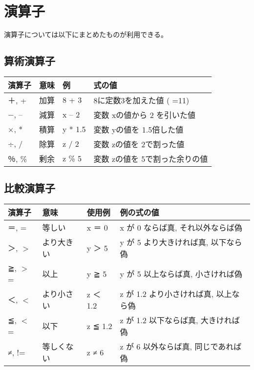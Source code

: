 \documentclass[11pt,a4j]{jarticle}
\begin{document}

\section{演算子}
\vspace{-0.2cm}
演算子については以下にまとめたものが利用できる。
\subsection{算術演算子}
\begin{table}[htbp]
  \begin{center}
    \begin{tabular}{p{1.5cm}|p{2.0cm}|p{1.7cm}|p{6.3cm}} \hline
    演算子	& 意味	& 例		& 式の値	\\ \hline
    ＋, +	& 加算	& 8 + 3		& 8に定数3を加えた値 ( =11)			\\ \hline
    −, --	& 減算	& x -- 2	& 変数 xの値から 2 を引いた値	 	\\ \hline
    ×, *	& 積算	& y * 1.5	& 変数 yの値を 1.5倍した値			\\ \hline
    ÷, /	& 除算	& z / 2		& 変数 zの値を 2で割った値			\\ \hline
    ％, \%	& 剰余	& z \% 5	& 変数 zの値を 5で割った余りの値	\\ \hline
    \end{tabular}
  \end{center}
  \vspace{-1.0cm}
\end{table}


\subsection{比較演算子}
\begin{table}[htbp]
  \begin{center}
    \begin{tabular}{p{1.5cm}|p{2.0cm}|p{1.7cm}|p{6.3cm}} \hline
    演算子		& 意味			& 使用例	& 例の式の値	\\ \hline
    ＝, =		& 等しい		& x ＝ 0	& x が 0 ならば真, それ以外ならば偽		\\ \hline
    ＞, $>$		& より大きい	& y ＞ 5	& y が 5 より大きければ真, 以下なら偽	\\ \hline
    ≧, $>$=	& 以上			& y ≧ 5	& y が 5 以上ならば真, 小さければ偽	\\ \hline
    ＜, $<$		& より小さい	& z ＜ 1.2	& z が 1.2 より小さければ真, 以上なら偽	\\ \hline
    ≦, $<$=	& 以下			& z ≦ 1.2	& z が 1.2 以下ならば真, 大きければ偽	\\ \hline
    ≠, !=		& 等しくない	& z ≠ 6	& z が 6 以外ならば真, 同じであれば偽	\\ \hline
    \end{tabular}
  \end{center}
  \vspace{-1.0cm}
\end{table}
\end{document}
